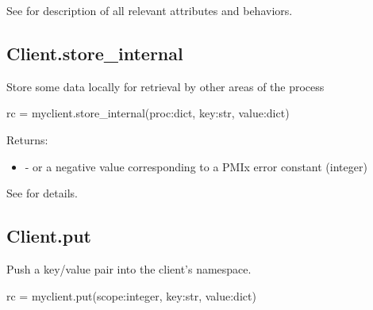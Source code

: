 See  for description of all relevant attributes and behaviors.


\subsection{Client.store_internal}

\summary

Store some data locally for retrieval by other areas of the process

\format

\pyspecificstart
\begin{codepar}
rc = myclient.store_internal(proc:dict, key:str, value:dict)
\end{codepar}
\pyspecificend

\begin{arglist}
\end{arglist}

Returns:

\begin{itemize}
    \item {} -  or a negative value corresponding to a PMIx error constant (integer)
\end{itemize}

See  for details.


\subsection{Client.put}

\summary

Push a key/value pair into the client's namespace.

\format

\pyspecificstart
\begin{codepar}
rc = myclient.put(scope:integer, key:str, value:dict)
\end{codepar}
\pyspecificend

\begin{arglist}
\end{arglist}


